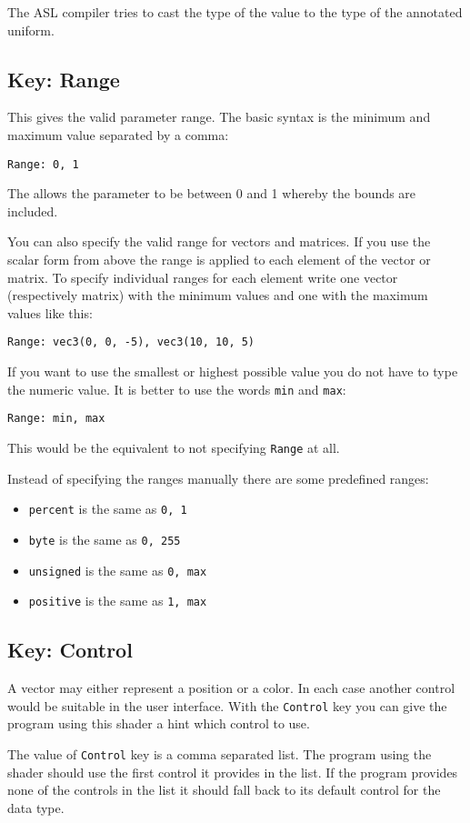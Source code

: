 \documentclass[11pt,a4paper]{scrreprt}
\newcommand{\key}[1]{\subsection{Key: #1}}
\begin{document}
The ASL compiler tries to cast the type of the value to the type of the 
annotated uniform.

\key{Range}
This gives the valid parameter range. The basic syntax is the minimum and 
maximum value separated by a comma:
\begin{lstlisting}
Range: 0, 1
\end{lstlisting}
The allows the parameter to be between 0 and 1 whereby the bounds are included.

You can also specify the valid range for vectors and matrices. If you use the 
scalar form from above the range is applied to each element of the vector or 
matrix. To specify individual ranges for each element write one vector 
(respectively matrix) with the minimum values and one with the maximum values 
like this:
\begin{lstlisting}
Range: vec3(0, 0, -5), vec3(10, 10, 5)
\end{lstlisting}

If you want to use the smallest or highest possible value you do not have to 
type the numeric value. It is better to use the words \lstinline$min$ and 
\lstinline$max$:
\begin{lstlisting}
Range: min, max
\end{lstlisting}
This would be the equivalent to not specifying \lstinline$Range$ at all.

Instead of specifying the ranges manually there are some predefined ranges:
\begin{itemize}
    \item \verb$percent$ is the same as \lstinline$0, 1$
    \item \verb$byte$ is the same as \lstinline$0, 255$
    \item \verb$unsigned$ is the same as \lstinline$0, max$
    \item \verb$positive$ is the same as \lstinline$1, max$
\end{itemize}

\key{Control}
A vector may either represent a position or a color. In each case another 
control would be suitable in the user interface. With the \lstinline$Control$ 
key you can give the program using this shader a hint which control to use.

The value of \lstinline$Control$ key is a comma separated list. The program 
using the shader should use the first control it provides in the list. If the 
program provides none of the controls in the list it should fall back to its 
default control for the data type.
\end{document}
